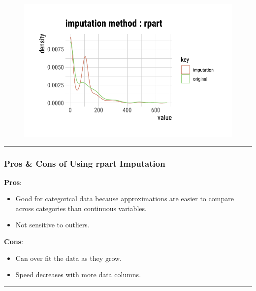 \documentclass[
  letterpaper,
  DIV=11,
  numbers=noendperiod]{scrreprt}
\begin{document}
\begin{figure}[H]

{\centering \includegraphics{./ImputatingLikeDataScientist_files/figure-pdf/unnamed-chunk-22-1.pdf}

}

\end{figure}

\begin{center}\rule{0.5\linewidth}{0.5pt}\end{center}

\hypertarget{pros-cons-of-using-rpart-imputation}{%
\subsubsection{Pros \& Cons of Using rpart
Imputation}\label{pros-cons-of-using-rpart-imputation}}

\textbf{Pros}:

\begin{itemize}
\item
  Good for categorical data because approximations are easier to compare
  across categories than continuous variables.
\item
  Not sensitive to outliers.
\end{itemize}

\textbf{Cons}:

\begin{itemize}
\item
  Can over fit the data as they grow.
\item
  Speed decreases with more data columns.
\end{itemize}

\begin{center}\rule{0.5\linewidth}{0.5pt}\end{center}
\end{document}
